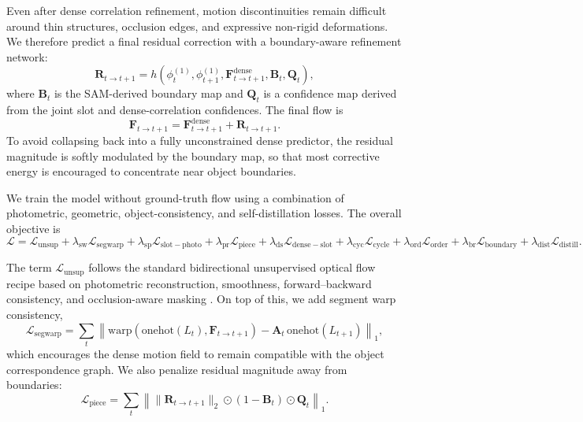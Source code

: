 Even after dense correlation refinement, motion discontinuities remain difficult around thin structures, occlusion edges, and expressive non-rigid deformations. We therefore predict a final residual correction with a boundary-aware refinement network:
\begin{equation}
\mathbf{R}_{t\rightarrow t+1} = h\left(\phi_t^{(1)},\phi_{t+1}^{(1)},\mathbf{F}^{\mathrm{dense}}_{t\rightarrow t+1},\mathbf{B}_t,\mathbf{Q}_t\right),
\end{equation}
where $\mathbf{B}_t$ is the SAM-derived boundary map and $\mathbf{Q}_t$ is a confidence map derived from the joint slot and dense-correlation confidences. The final flow is
\begin{equation}
\mathbf{F}_{t\rightarrow t+1} = \mathbf{F}^{\mathrm{dense}}_{t\rightarrow t+1} + \mathbf{R}_{t\rightarrow t+1}.
\end{equation}
To avoid collapsing back into a fully unconstrained dense predictor, the residual magnitude is softly modulated by the boundary map, so that most corrective energy is encouraged to concentrate near object boundaries.

We train the model without ground-truth flow using a combination of photometric, geometric, object-consistency, and self-distillation losses. The overall objective is
\begin{equation}
\label{eq:total_loss}
\mathcal{L} = \mathcal{L}_{\mathrm{unsup}} + \lambda_{\mathrm{sw}}\mathcal{L}_{\mathrm{segwarp}} + \lambda_{\mathrm{sp}}\mathcal{L}_{\mathrm{slot-photo}} + \lambda_{\mathrm{pr}}\mathcal{L}_{\mathrm{piece}} + \lambda_{\mathrm{ds}}\mathcal{L}_{\mathrm{dense-slot}} + \lambda_{\mathrm{cyc}}\mathcal{L}_{\mathrm{cycle}} + \lambda_{\mathrm{ord}}\mathcal{L}_{\mathrm{order}} + \lambda_{\mathrm{br}}\mathcal{L}_{\mathrm{boundary}} + \lambda_{\mathrm{dist}}\mathcal{L}_{\mathrm{distill}}.
\end{equation}

The term $\mathcal{L}_{\mathrm{unsup}}$ follows the standard bidirectional unsupervised optical flow recipe based on photometric reconstruction, smoothness, forward--backward consistency, and occlusion-aware masking \cite{meister2018unflow}. On top of this, we add segment warp consistency,
\begin{equation}
\mathcal{L}_{\mathrm{segwarp}} = \sum_t \left\| \mathrm{warp}(\mathrm{onehot}(L_t),\mathbf{F}_{t\rightarrow t+1}) - \mathbf{A}_t\,\mathrm{onehot}(L_{t+1}) \right\|_1,
\end{equation}
which encourages the dense motion field to remain compatible with the object correspondence graph. We also penalize residual magnitude away from boundaries:
\begin{equation}
\mathcal{L}_{\mathrm{piece}} = \sum_t \left\| \|\mathbf{R}_{t\rightarrow t+1}\|_2 \odot (1-\mathbf{B}_t) \odot \mathbf{Q}_t \right\|_1.
\end{equation}

